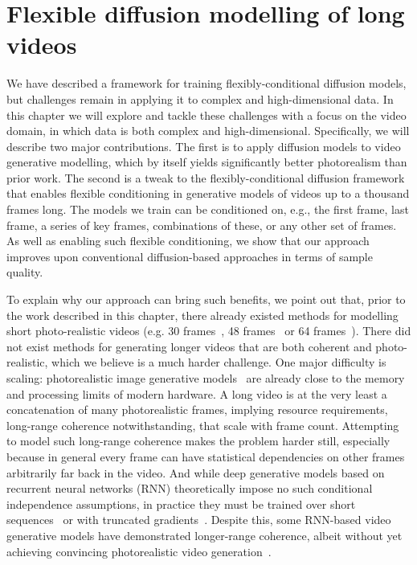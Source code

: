 \chapter{Flexible diffusion modelling of long videos}
\label{ch:fdm}

We have described a framework for training flexibly-conditional diffusion models, but challenges remain in applying it to complex and high-dimensional data. In this chapter we will explore and tackle these challenges with a focus on the video domain, in which data is both complex and high-dimensional. Specifically, we will describe two major contributions. The first is to apply diffusion models to video generative modelling, which by itself yields significantly better photorealism than prior work. The second is a tweak to the flexibly-conditional diffusion framework that enables flexible conditioning in generative models of videos up to a thousand frames long. The models we train can be conditioned on, e.g., the first frame, last frame, a series of key frames, combinations of these, or any other set of frames. As well as enabling such flexible conditioning, we show that our approach improves upon conventional diffusion-based approaches in terms of sample quality.

To explain why our approach can bring such benefits, we point out that, prior to the work described in this chapter, there already existed methods for modelling short photo-realistic videos (e.g. 30 frames~\citep{weissenborn2019scaling}, 48 frames~\cite{clark2019adversarial} or 64 frames~\citep{ho2022video}). There did not exist methods for generating longer videos that are both coherent and photo-realistic, which we believe is a much harder challenge. One major difficulty is scaling: photorealistic image generative models~\citep{child2020very,dhariwal2021diffusion} are already close to the memory and processing limits of modern hardware.  A long video is at the very least a concatenation of many photorealistic frames, implying resource requirements, long-range coherence notwithstanding, that scale with frame count. Attempting to model such long-range coherence makes the problem harder still, especially because in general every frame can have statistical dependencies on other frames arbitrarily far back in the video. And while deep generative models based on recurrent neural networks (RNN) theoretically impose no such conditional independence assumptions, in practice they must be trained over short sequences~\cite{gruslys2016memory,saxena2021clockwork} or with truncated gradients~\citep{tallec2017unbiasing}.  Despite this, some RNN-based video generative models have demonstrated longer-range coherence, albeit without yet achieving convincing photorealistic video generation~\citep{saxena2021clockwork,babaeizadeh2021fitvid,denton2018stochastic,kim2019variational,babaeizadeh2017stochastic}.


